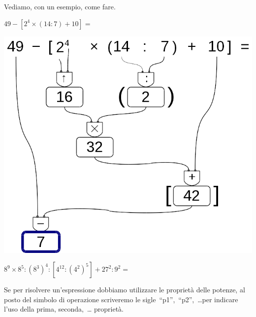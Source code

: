 Vediamo, con un esempio, come fare.

\begin{exrig}
 \begin{esempio}
  $49 - [2^4 \times (14 : 7) + 10]=$
  
\begin{inaccessibleblock}
 \begin{center}
  \includegraphics[scale=0.35]{img/op_espr.png}
 \end{center}
\end{inaccessibleblock}
 \end{esempio}

 \begin{esempio}
  $8^9 \times 8^5 : (8^3)^4 : [4^{12} : (4^2)^5] + 27^2 : 9^2 =$
  
  Se per risolvere un'espressione dobbiamo utilizzare le proprietà delle 
  potenze, al posto del simbolo di operazione scriveremo le 
  sigle~``p1'',~``p2'',~\dots per indicare l'uso della prima, seconda,~\dots
  proprietà.
  

\end{esempio}
\end{exrig}
